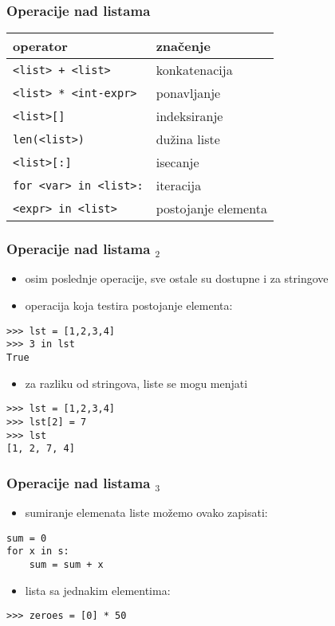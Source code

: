 \documentclass[utf8,compress]{beamer}
\begin{document}
\begin{frame}[fragile]
  \frametitle{Operacije nad listama}
\begin{center}
\begin{tabular}{l|l}
\textbf{operator} & \textbf{značenje} \\ \hline
\texttt{<list> + <list>} & konkatenacija \\
\texttt{<list> * <int-expr>} & ponavljanje \\
\texttt{<list>[]} & indeksiranje \\
\texttt{len(<list>)} & dužina liste \\
\texttt{<list>[:]} & isecanje \\
\texttt{for <var> in <list>:} & iteracija \\
\texttt{<expr> in <list>} & postojanje elementa
\end{tabular}
\end{center}
\end{frame}

\begin{frame}[fragile]
  \frametitle{Operacije nad listama $_2$}
  \begin{itemize}
    \item osim poslednje operacije, sve ostale su dostupne i za stringove
    \item operacija koja testira postojanje elementa:
  \end{itemize}
\begin{verbatim}
>>> lst = [1,2,3,4]
>>> 3 in lst
True
\end{verbatim}
  \begin{itemize}
    \item za razliku od stringova, liste se mogu menjati
  \end{itemize}
\begin{verbatim}
>>> lst = [1,2,3,4]
>>> lst[2] = 7
>>> lst
[1, 2, 7, 4]
\end{verbatim}
\end{frame}

\begin{frame}[fragile]
  \frametitle{Operacije nad listama $_3$}
  \begin{itemize}
    \item sumiranje elemenata liste možemo ovako zapisati:
  \end{itemize}
\begin{verbatim}
sum = 0
for x in s:
    sum = sum + x
\end{verbatim}
  \begin{itemize}
    \item lista sa jednakim elementima:
  \end{itemize}
\begin{verbatim}
>>> zeroes = [0] * 50
\end{verbatim}
\end{frame}
\end{document}
